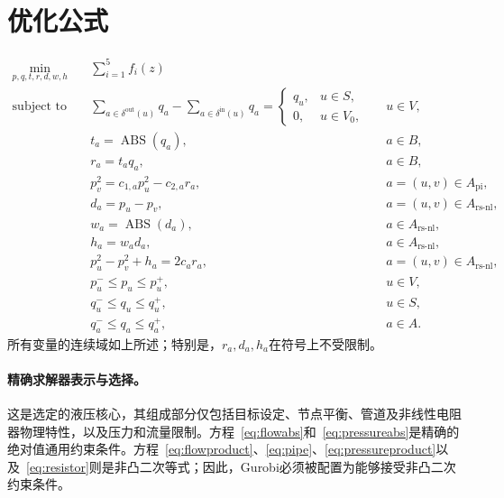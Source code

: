 \documentclass[11pt]{article}
\begin{document}
\section{优化公式}
\begin{align}
\min_{p,q,t,r,d,w,h}\quad
&\sum_{i=1}^{5} f_i(z)
\label{eq:objective}\\
\text{subject to}\quad
&\sum_{a\in\delta^{\mathrm{out}}(u)}q_a
-\sum_{a\in\delta^{\mathrm{in}}(u)}q_a
=\begin{cases}
q_u,&u\in S,\\
0,&u\in V_0,
\end{cases}
&&u\in V,
\label{eq:balance}\\
&t_a=\operatorname{ABS}(q_a),
&&a\in B,
\label{eq:flowabs}\\
&r_a=t_aq_a,
&&a\in B,
\label{eq:flowproduct}\\
&p_v^2=c_{1,a}p_u^2-c_{2,a}r_a,
&&a=(u,v)\in A_{\mathrm{pi}},
\label{eq:pipe}\\
&d_a=p_u-p_v,
&&a=(u,v)\in A_{\mathrm{rs\text{-}nl}},
\label{eq:difference}\\
&w_a=\operatorname{ABS}(d_a),
&&a\in A_{\mathrm{rs\text{-}nl}},
\label{eq:pressureabs}\\
&h_a=w_ad_a,
&&a\in A_{\mathrm{rs\text{-}nl}},
\label{eq:pressureproduct}\\
&p_u^2-p_v^2+h_a=2c_ar_a,
&&a=(u,v)\in A_{\mathrm{rs\text{-}nl}},
\label{eq:resistor}\\
&p_u^-\leq p_u\leq p_u^+,
&&u\in V,
\label{eq:pressurebounds}\\
&q_u^-\leq q_u\leq q_u^+,
&&u\in S,
\label{eq:nodalbounds}\\
&q_a^-\leq q_a\leq q_a^+,
&&a\in A.
\label{eq:arcbounds}
\end{align}
所有变量的连续域如上所述；特别是，$r_a,d_a,h_a$在符号上不受限制。

\paragraph{精确求解器表示与选择。}
这是选定的液压核心，其组成部分仅包括目标设定、节点平衡、管道及非线性电阻器物理特性，以及压力和流量限制。方程~\eqref{eq:flowabs}和~\eqref{eq:pressureabs}是精确的绝对值通用约束条件。方程~\eqref{eq:flowproduct}、\eqref{eq:pipe}、\eqref{eq:pressureproduct}以及~\eqref{eq:resistor}则是非凸二次等式；因此，Gurobi必须被配置为能够接受非凸二次约束条件。 
\end{document}
